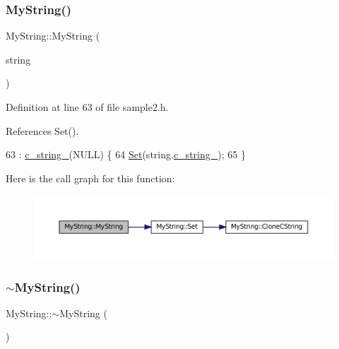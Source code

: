 \subsubsection{\texorpdfstring{My\+String()}{MyString()}\hspace{0.1cm}{\footnotesize\ttfamily [3/3]}}
{\footnotesize\ttfamily My\+String\+::\+My\+String (\begin{DoxyParamCaption}\item[{const \hyperlink{classMyString}{My\+String} \&}]{string }\end{DoxyParamCaption})\hspace{0.3cm}{\ttfamily [inline]}}



Definition at line 63 of file sample2.\+h.



References Set().


\begin{DoxyCode}
63                                    : \hyperlink{classMyString_a1872c0d04ff5f6e654161472b18bb9d0}{c\_string\_}(NULL) \{
64     \hyperlink{classMyString_a521c4cd7eccac6ce554d8a51505e4970}{Set}(\textcolor{keywordtype}{string}.\hyperlink{classMyString_a1872c0d04ff5f6e654161472b18bb9d0}{c\_string\_});
65   \}
\end{DoxyCode}
Here is the call graph for this function\+:
\nopagebreak
\begin{figure}[H]
\begin{center}
\leavevmode
\includegraphics[width=350pt]{classMyString_ae24c7cf89a58dd2287303df2ac054c66_cgraph}
\end{center}
\end{figure}
\mbox{\label{classMyString_a7bee4fe8ad82a0b7b8f65b02054b156b}} 
\subsubsection{\texorpdfstring{$\sim$\+My\+String()}{~MyString()}}
{\footnotesize\ttfamily My\+String\+::$\sim$\+My\+String (\begin{DoxyParamCaption}{ }\end{DoxyParamCaption})\hspace{0.3cm}{\ttfamily [inline]}}



